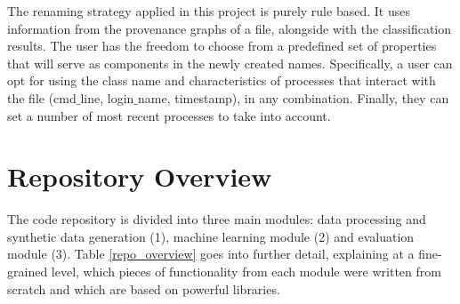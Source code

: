 The renaming strategy applied in this project is purely rule based. It uses information from the provenance graphs of a file, alongside with the classification results. The user has the freedom to choose from a predefined set of properties that will serve as components in the newly created names. Specifically, a user can opt for using the class name and characteristics of processes that interact with the file (cmd$\_$line, login$\_$name, timestamp), in any combination. Finally, they can set a number of most recent processes to take into account. 

\section{Repository Overview}

The code repository is divided into three main modules: data processing and synthetic data generation (1), machine learning module (2) and evaluation module (3). Table \ref{repo_overview} goes into further detail, explaining at a fine-grained level, which pieces of functionality from each module were written from scratch and which are based on powerful libraries. 

